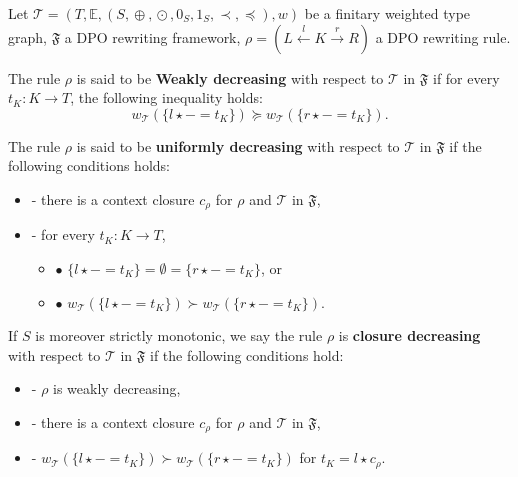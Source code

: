 \begin{definition}
    \label{wf:def:decreasing_rule}
    Let $\mathcal{T} \mathop{=} (T,\mathbb{E}, (S, \mathop{\oplus}, \mathop{\odot}, 0_S, 1_S, \prec, \mathop{\preceq}),w)$ be a finitary weighted type graph, \(\mathfrak{F}\) a DPO rewriting framework, $\rho \mathop{=} (L \overset{l}{\leftarrow} K \overset{r}{\rightarrow} R)$ a DPO rewriting rule.
 
    \noindent
    The rule $\rho$ is said to be \textbf{Weakly decreasing} with respect to $\mathcal{T}$ in $\mathfrak{F}$ if 
            for every $t_K : K \mathop{\to} T$, the following inequality holds:
                $$ 
                  w_\mathcal{T}(\{l \mathop{\star} - \mathop{=} t_K\}) \mathop{\succeq} w_\mathcal{T}(\{r\star - \mathop{=} t_K\}).$$
           
    \noindent
    The rule $\rho$ is said to be \textbf{uniformly decreasing} with respect to $\mathcal{T}$ in $\mathfrak{F}$ if the following conditions holds:
        \begin{itemize}
            \item[]- there is a context closure $c_\rho$ for $\rho$ and $\mathcal{T}$ in $\mathfrak{F}$, 
            \item[]- for every $t_K : K \mathop{\to} T$,
            \begin{itemize}
                \item[] $\bullet$ $\{l \mathop{\star} - \mathop{=} t_K\} \mathop{=} \emptyset \mathop{=} \{r \mathop{\star} - \mathop{=} t_K\}$, or
                \item[] $\bullet$ $w_\mathcal{T}(\{l \mathop{\star} - \mathop{=} t_K\}) 
                        \mathop{\succ}   w_\mathcal{T}(\{r \mathop{\star} - \mathop{=} t_K\}) $.
            \end{itemize}
        \end{itemize}  
         
    \noindent
   If $S$ is moreover strictly monotonic, we say the rule $\rho$ is
            \textbf{closure decreasing} with respect to $\mathcal{T}$ in $\mathfrak{F}$ if the following conditions hold:
            \begin{itemize}
                \item[]- $\rho$ is weakly decreasing,
                \item[]- there is a context closure $c_\rho$ for $\rho$ and $\mathcal{T}$ in $\mathfrak{F}$,
                \item[]- $w_\mathcal{T}(\{l \mathop{\star} - \mathop{=} t_K\})  
                \mathop{\succ}  w_\mathcal{T}(\{r \mathop{\star} - \mathop{=} t_K\})$ for $t_K \mathop{=} l \mathop{\star} c_\rho$.
            \end{itemize}
\end{definition}

